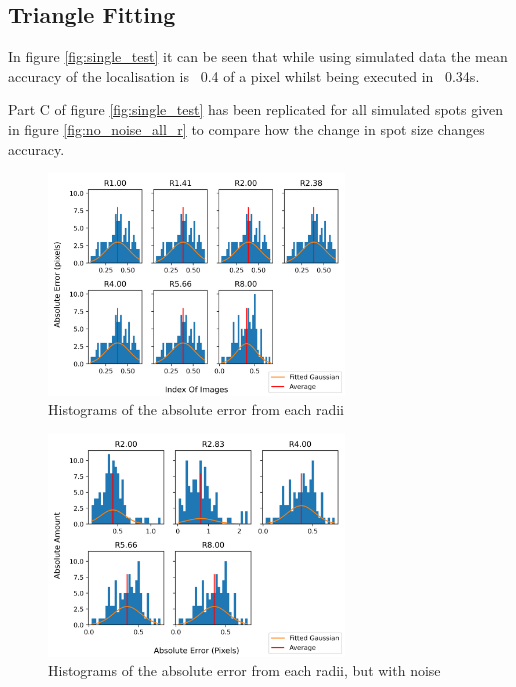 \documentclass[aps,pra,a4paper,nofootinbib,onecolumn,tightenlines,longbibliography,12pt,amsfonts,amssymb,amsmath,floatfix]{revtex4-2} %
\begin{document}
  
    

  \subsection{Triangle Fitting} %
  \label{sub:Triangle Fitting}

  In figure \ref{fig:single_test} it can be seen that while using simulated data the mean accuracy of the 
  localisation is ~0.4 of a pixel whilst being executed in ~0.34s.

  Part C of figure \ref{fig:single_test} has been replicated for all simulated spots given in figure \ref{fig:no_noise_all_r}
  to compare how the change in spot size changes accuracy.

  

  

  \begin{figure}[H]
    \begin{center}
      \includegraphics[width=0.7\textwidth]{project_pics/distro.png}
    \end{center}
    \caption{Histograms of the absolute error from each radii}
    \label{fig:distro}
  \end{figure}




  \begin{figure}[H]
    \begin{center}
      \includegraphics[width=0.7\textwidth]{project_pics/distro_noise.png}
    \end{center}
    \caption{Histograms of the absolute error from each radii, but with noise}
    \label{fig:distro_noise}
  \end{figure}
\end{document}
